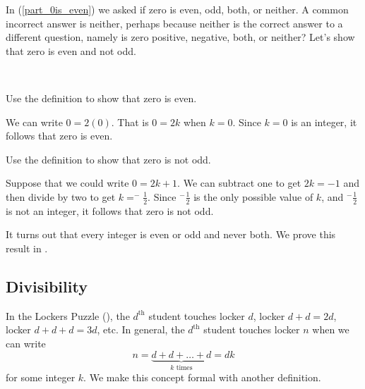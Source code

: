 In  (\ref{part_0is_even}) we asked if zero is even, odd, both, or neither.  A common incorrect answer is neither, perhaps because neither is the correct answer to a different question, namely is zero positive, negative, both, or neither?  Let's show that zero is even and not odd.

\begin{exam}
\label{exam_0is_even}
~
    \begin{apart}
        \item Use the definition to show that zero is even.
            \begin{soln}
                We can write $0 = 2(0)$.  That is $0 = 2k$ when $k=0$.  Since $k=0$ is an integer, it follows that zero is even.
            \end{soln}
        \item Use the definition to show that zero is not odd.
            \begin{soln}
                Suppose that we could write $0 = 2k+1$.  We can subtract one to get $2k=-1$ and then divide by two to get $k = ^-\frac{1}{2}$.  Since $^-\frac{1}{2}$ is the only possible value of $k$, and $^-\frac{1}{2}$ is not an integer, it follows that zero is not odd.
            \end{soln}
    \end{apart}
\end{exam}

It turns out that every integer is even or odd and never both.  We prove this result in .

\newcommand{\subdivides}{Divisibility}
\subsection{\subdivides}
\label{sub_divides}

In the Lockers Puzzle (), the $d^{\text{th}}$ student touches locker $d$, locker $d+d=2d$, locker $d+d+d=3d$, etc.  In general, the $d^{\text{th}}$ student touches locker $n$ when we can write $$n=\underbrace{d+d+ \ldots+d}_{k \text{ times}} =dk$$ for some integer $k$.  We make this concept formal with another definition.


